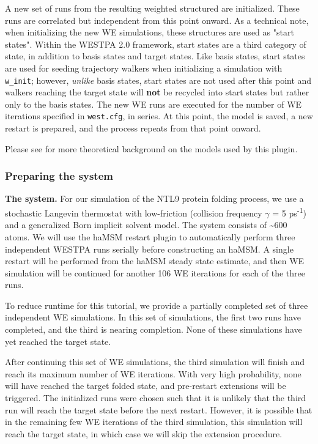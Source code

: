 A new set of runs from the resulting weighted structured are initialized. 
These runs are correlated but independent from this point onward.
As a technical note, when initializing the new WE simulations, these structures are used as "start states". 
Within the WESTPA 2.0 framework, start states are a third category of state, in addition to basis states and target states. 
Like basis states, start states are used for seeding trajectory walkers when initializing a simulation with \verb|w_init|; however, \textit{unlike} basis states, start states are not used after this point and walkers reaching the target state will \textbf{not} be recycled into start states but rather only to the basis states. 
The new WE runs are executed for the number of WE iterations specified in \verb|west.cfg|, in series. 
At this point, the model is saved, a new restart is prepared, and the process repeats from that point onward.

Please see \citep{russo_westpa_2022, copperman_accelerated_2020} for more theoretical background on the models used by this plugin.
\subsubsection{Preparing the system}

\noindent\textbf{The system.} For our simulation of the NTL9 protein folding process, we use a stochastic Langevin thermostat with low-friction (collision frequency $\gamma$ = 5 ps\textsuperscript{-1}) and a generalized Born implicit solvent model. 
The system consists of \textasciitilde600 atoms. 
We will use the haMSM restart plugin to automatically perform three independent WESTPA runs serially before constructing an haMSM. 
A single restart will be performed from the haMSM steady state estimate, and then WE simulation will be continued for another 106 WE iterations for each of the three runs.

To reduce runtime for this tutorial, we provide a partially completed set of three independent WE simulations. 
In this set of simulations, the first two runs have completed, and the third is nearing completion. 
None of these simulations have yet reached the target state. 

After continuing this set of WE simulations, the third simulation will finish and reach its maximum number of WE iterations. 
With very high probability, none will have reached the target folded state, and pre-restart extensions will be triggered. 
The initialized runs were chosen such that it is unlikely that the third run will reach the target state before the next restart. 
However, it is possible that in the remaining few WE iterations of the third simulation, this simulation will reach the target state, in which case we will skip the extension procedure.

